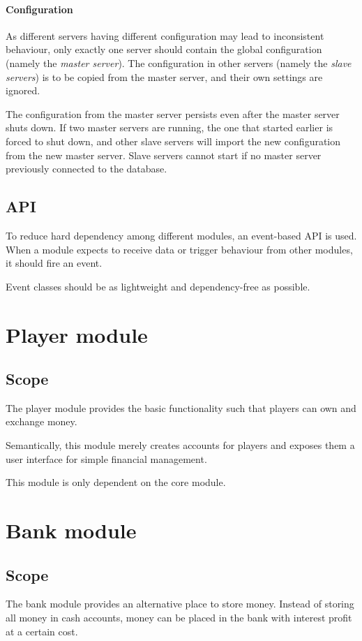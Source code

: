 \documentclass{report}
\begin{document}
				\subsection{Configuration}
					As different servers having different configuration may lead to inconsistent behaviour,
					only exactly one server should contain the global configuration (namely the \emph{master server}).
					The configuration in other servers (namely the \emph{slave servers}) is to be copied from the master server,
					and their own settings are ignored.

					The configuration from the master server persists even after the master server shuts down.
					If two master servers are running, the one that started earlier is forced to shut down,
					and other slave servers will import the new configuration from the new master server.
					Slave servers cannot start if no master server previously connected to the database.

		\chapter{API}
			To reduce hard dependency among different modules, an event-based API is used.
			When a module expects to receive data or trigger behaviour from other modules,
			it should fire an event.

			Event classes should be as lightweight and dependency-free as possible.

	\part{Player module}
		\chapter{Scope}
			The player module provides the basic functionality such that players can own and exchange money.

			Semantically, this module merely creates accounts for players and exposes them a user interface for simple financial management.

			This module is only dependent on the core module.

	\part{Bank module}
		\chapter{Scope}
			The bank module provides an alternative place to store money.
			Instead of storing all money in cash accounts, money can be placed in the bank with interest profit at a certain cost.
\end{document}
